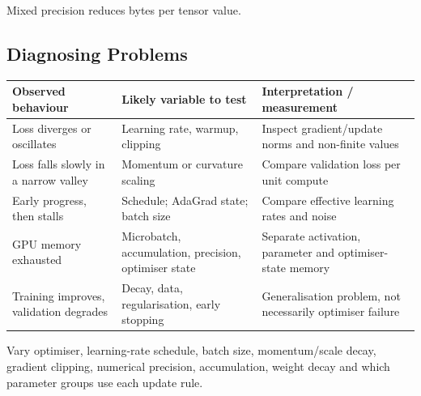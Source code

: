 \begin{calloutmemoryhook}
    Mixed precision reduces bytes per tensor value.
\end{calloutmemoryhook}

\subsection{Diagnosing Problems}

\begin{center}
    \small
    \begin{tabularx}{.96\linewidth}{@{}L{.29\linewidth}YY@{}}
    \toprule
    \textbf{Observed behaviour} & \textbf{Likely variable to test} & \textbf{Interpretation / measurement} \\
    \midrule
    Loss diverges or oscillates & Learning rate, warmup, clipping & Inspect gradient/update norms and non-finite values \\
    Loss falls slowly in a narrow valley & Momentum or curvature scaling & Compare validation loss per unit compute \\
    Early progress, then stalls & Schedule; AdaGrad state; batch size & Compare effective learning rates and noise \\
    GPU memory exhausted & Microbatch, accumulation, precision, optimiser state & Separate activation, parameter and optimiser-state memory \\
    Training improves, validation degrades & Decay, data, regularisation, early stopping & Generalisation problem, not necessarily optimiser failure \\
    \bottomrule
    \end{tabularx}
\end{center}

\begin{calloutdegreeofexperiment}
Vary optimiser, learning-rate schedule, batch size, momentum/scale decay, gradient clipping, numerical precision, accumulation, weight decay and which parameter groups use each update rule.
\end{calloutdegreeofexperiment}


